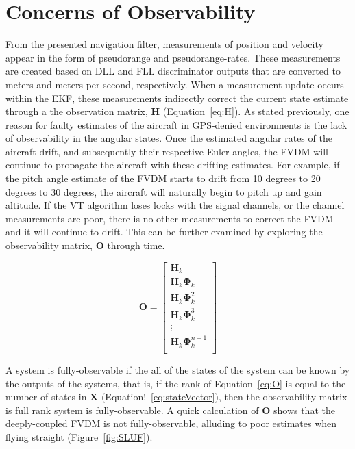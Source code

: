 \section{\textbf{Concerns of Observability}}

From the presented navigation filter, measurements of position and velocity appear in the form of pseudorange and pseudorange-rates. These measurements are created based on DLL and FLL discriminator outputs that are converted to meters and meters per second, respectively. When a measurement update occurs within the EKF, these measurements indirectly correct the current state estimate through a the observation matrix, \(\mathbf{H}\) (Equation~\ref{eq:H}). As stated previously, one reason for faulty estimates of the aircraft in GPS-denied environments is the lack of observability in the angular states. Once the estimated angular rates of the aircraft drift, and subsequently their respective Euler angles, the FVDM will continue to propagate the aircraft with these drifting estimates. For example, if the pitch angle estimate of the FVDM starts to drift from 10 degrees to 20 degrees to 30 degrees, the aircraft will naturally begin to pitch up and gain altitude. If the VT algorithm loses locks with the signal channels, or the channel measurements are poor, there is no other measurements to correct the FVDM and it will continue to drift. This can be further examined by exploring the observability matrix, \(\mathbf{O}\) through time.

\begin{equation}\label{eq:O}
    \mathbf{O} = \begin{bmatrix}
        \mathbf{H}_k                    \\
        \mathbf{H}_k\mathbf{\Phi}_k       \\
        \mathbf{H}_k\mathbf{\Phi}_k^2     \\
        \mathbf{H}_k\mathbf{\Phi}_k^3     \\
        \vdots                        \\
        \mathbf{H}_k\mathbf{\Phi}_k^{n-1} \\
    \end{bmatrix}
\end{equation}

A system is fully-observable if the all of the states of the system can be known by the outputs of the systems, that is, if the rank of Equation~\ref{eq:O} is equal to the number of states in \(\mathbf{X}\) (Equation!~\ref{eq:stateVector}), then the observability matrix is full rank system is fully-observable. A quick calculation of \(\mathbf{O}\) shows that the deeply-coupled FVDM is not fully-observable, alluding to poor estimates when flying straight (Figure~\ref{fig:SLUF}).  

